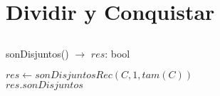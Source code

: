 \documentclass[10pt, a4paper]{article}
\begin{document}
\section{Dividir y Conquistar}
\subsection{}

\begin{algorithm}[H]{sonDisjuntos() $\to$ $res$: bool}	
	\begin{algorithmic}[1]
		\State $res \gets sonDisjuntosRec(C, 1, tam(C))$\\
		\Return $res.sonDisjuntos$
    \end{algorithmic}
\end{algorithm}	
\end{document}
